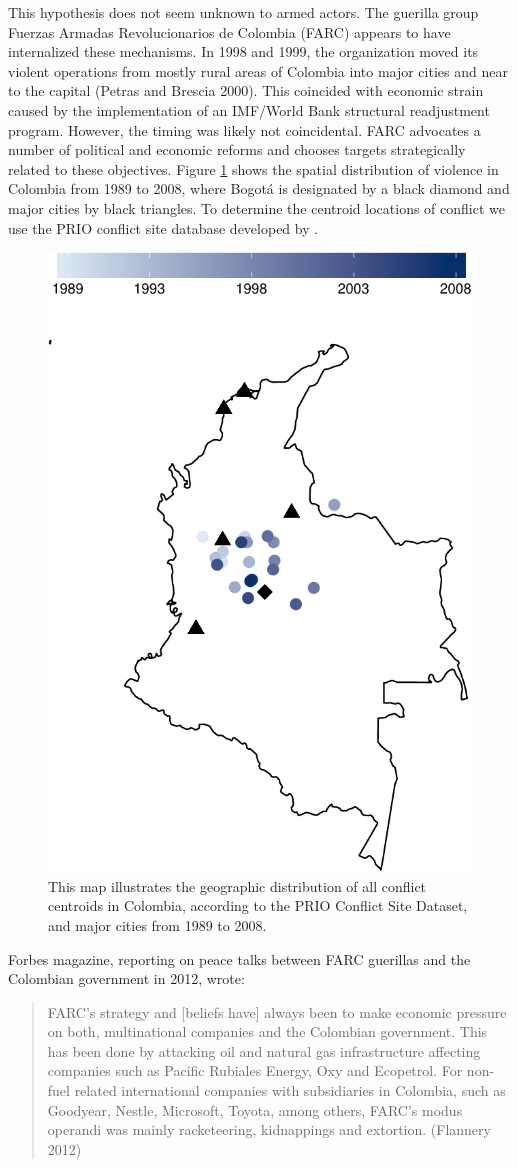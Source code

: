 This hypothesis does not seem unknown to armed actors. The guerilla group Fuerzas Armadas Revolucionarios de Colombia (FARC) appears to have internalized these mechanisms. In 1998 and 1999, the organization moved its violent operations from mostly rural areas of Colombia into major cities and near to the capital (Petras and Brescia 2000). This coincided with economic strain caused by the implementation of an IMF/World Bank structural readjustment program. However, the timing was likely not coincidental. FARC advocates a number of political and economic reforms and chooses targets strategically related to these objectives. Figure \ref{fig:columbiaMap} shows the spatial distribution of violence in Colombia from 1989 to 2008, where Bogot\'{a} is designated by a black diamond and major cities by black triangles. To determine the centroid locations of conflict we use the PRIO conflict site database developed by \citet{hallberg:2012}. 

\begin{figure}[ht]
	\centering
	\includegraphics[width=.5\textwidth]{colombiaMap-crop}
	\caption{This map illustrates the geographic distribution of all conflict centroids in Colombia, according to the PRIO Conflict Site Dataset, and major cities from 1989 to 2008.}
	\label{fig:columbiaMap}
\end{figure}

Forbes magazine, reporting on peace talks between FARC guerillas and the Colombian government in 2012, wrote: 

\begin{quote}
	FARC's strategy and [beliefs have] always been to make economic pressure on both, multinational companies and the Colombian government. This has been done by attacking oil and natural gas infrastructure affecting companies such as Pacific Rubiales Energy, Oxy and Ecopetrol. For non-fuel related international companies with subsidiaries in Colombia, such as Goodyear, Nestle, Microsoft, Toyota, among others, FARC’s modus operandi was mainly racketeering, kidnappings and extortion. (Flannery 2012)
\end{quote}

